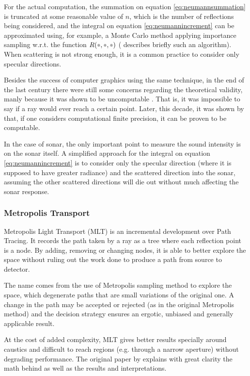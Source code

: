 For the actual computation, the summation on equation \ref{eq:neumannsummation}
is truncated at some reasonable value of $n$, which is the number of
reflections being considered, and the integral on equation
\ref{eq:neumannincrement} can be approximated using, for example, a Monte Carlo
method applying importance sampling w.r.t. the function $R(\parm,\parm,\parm)$
(\citet{munjal2013formulas} describes briefly such an algorithm).
When scattering is not strong enough, it is a common practice to consider only
specular directions. 

Besides the success of computer graphics using the same technique, in the end of
the last century there were still some concerns regarding the theoretical
validity, manly because it was shown to be
uncomputable \cite{reif1994computability}. That is, it was impossible to say if
a ray would ever reach a certain point. Later, this decade, it was shown by
\citet{blakey2014ray} that, if one considers computational finite precision, it
can be proven to be computable.

In the case of sonar, the only important point to measure the sound intensity is
on the sonar itself. A simplified approach for the integral on equation
\ref{eq:neumannincrement} is to consider only the specular direction (where it
is supposed to have greater radiance) and the scattered direction into the
sonar, assuming the other scattered directions will die out without much
affecting the sonar response.


\subsubsection{Metropolis Transport}

Metropolis Light Transport (MLT) is an incremental development over Path
Tracing.
It records the path taken by a ray as a tree where each reflection point is a node. By
adding, removing or changing nodes, it is able to better explore the space
without ruling out the work done to produce a path from source to detector.

The name comes from the use of Metropolis sampling method to explore the space,
which degenerate paths that are small variations of the original one. A change
in the path may be accepted or rejected (as in the original Metropolis method)
and the decision strategy ensures an ergotic, unbiased and generally applicable
result.

At the cost of added complexity, MLT gives better results specially around
caustics and difficult to reach regions (e.g. through a narrow aperture)
without degrading performance. The original paper by \citet{veach1997metropolis}
explains with great clarity the math behind as well as the results and
interpretations.


